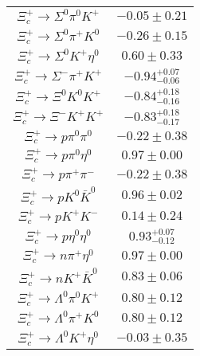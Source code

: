 \begin{table}
{\begin{tabular}{|c|c|}
			$\Xi_{c}^{+} \to  \Sigma^{0} \pi^{0} K^{+} $ & $      -0.05 \pm       0.21 $ \\
			$\Xi_{c}^{+} \to \Sigma^{0} \pi^{+} K^{0} $ & $      -0.26 \pm       0.15 $ \\
			$\Xi_{c}^{+} \to  \Sigma^{0} K^{+} \eta^{0} $ & $       0.60 \pm       0.33 $ \\
			$\Xi_{c}^{+} \to  \Sigma^{-} \pi^{+} K^{+} $ & $      -0.94 ^{+0.07}_{-0.06} $ \\
			$\Xi_{c}^{+} \to \Xi^{0} K^{0} K^{+} $ & $      -0.84  ^{+0.18}_{-0.16} $ \\
			$\Xi_{c}^{+} \to  \Xi^{-} K^{+} K^{+} $ & $      -0.83^{+ 0.18}_{-0.17} $ \\
			$\Xi_{c}^{+} \to  p \pi^{0} \pi^{0} $ & $      -0.22 \pm       0.38 $ \\
			$\Xi_{c}^{+} \to  p \pi^{0} \eta^{0} $ & $       0.97 \pm       0.00 $ \\
			$\Xi_{c}^{+} \to  p \pi^{+} \pi^{-} $ & $      -0.22 \pm       0.38 $ \\
			$\Xi_{c}^{+} \to  p K^{0} \bar{K}^{0} $ & $       0.96 \pm       0.02 $ \\
			$\Xi_{c}^{+} \to  p K^{+} K^{-} $ & $       0.14 \pm       0.24 $ \\
			$\Xi_{c}^{+} \to  p \eta^{0} \eta^{0} $ & $       0.93 ^{+0.07}_{-0.12} $ \\
			$\Xi_{c}^{+} \to  n \pi^{+} \eta^{0} $ & $       0.97 \pm       0.00 $ \\
			$\Xi_{c}^{+} \to  n K^{+} \bar{K}^{0} $ & $       0.83 \pm       0.06 $ \\
			$\Xi_{c}^{+} \to  \Lambda^{0} \pi^{0} K^{+} $ & $       0.80 \pm       0.12 $ \\
			$\Xi_{c}^{+} \to  \Lambda^{0} \pi^{+} K^{0} $ & $       0.80 \pm       0.12 $ \\
			$\Xi_{c}^{+} \to  \Lambda^{0} K^{+} \eta^{0} $ & $      -0.03 \pm       0.35 $ \\
			\hline
		\end{tabular}
	}
\end{table}

